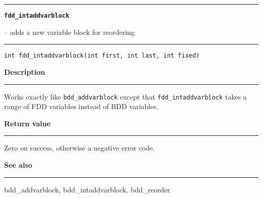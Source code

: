 \vspace{8ex}
\begin{minipage}{\textwidth}

\noindent\begin{minipage}{\textwidth}
\rule{\textwidth}{0.5mm}
{\tt\bf fdd\_intaddvarblock }
\--- adds a new variable block for reordering  \hspace{\fill}
\\\rule[1.5ex]{\textwidth}{0.5mm}
\end{minipage}

\noindent\begin{verbatim}
int fdd_intaddvarblock(int first, int last, int fixed) 
\end{verbatim}

\vspace{\parsep}\noindent
{\bf Description}\\\rule[1.5ex]{\textwidth}{0.2mm}\vspace{-1.5ex}\setlength{\parindent}{1em}
Works exactly like {\tt bdd\_addvarblock} except that
           {\tt fdd\_intaddvarblock} takes a range of FDD variables
	   instead of BDD variables. 

\setlength{\parindent}{0em}\vspace{\parsep}\vspace{\baselineskip}\noindent
{\bf Return value}\\\rule[1.5ex]{\textwidth}{0.2mm}\vspace{-1.5ex}
Zero on success, otherwise a negative error code. 

\vspace{\parsep}\vspace{\baselineskip}\noindent
{\bf See also}\\\rule[1.5ex]{\textwidth}{0.2mm}\vspace{-1.5ex}
bdd\_addvarblock, bdd\_intaddvarblock, bdd\_reorder 
\end{minipage}
\vspace{8ex}
